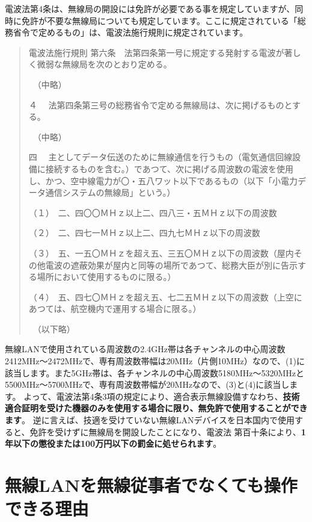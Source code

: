 電波法第4条は、無線局の開設には免許が必要である事を規定していますが、同時に免許が不要な無線局についても規定しています。ここに規定されている「総務省令で定めるもの」は、電波法施行規則に規定されています。
\begin{quotation}
    電波法施行規則 第六条　法第四条第一号に規定する発射する電波が著しく微弱な無線局を次のとおり定める。

    　（中略）

    ４ 　法第四条第三号の総務省令で定める無線局は、次に掲げるものとする。

    　（中略）

    四 　主としてデータ伝送のために無線通信を行うもの（電気通信回線設備に接続するものを含む。）であつて、次に掲げる周波数の電波を使用し、かつ、空中線電力が〇・五八ワット以下であるもの（以下「小電力データ通信システムの無線局」という。）

    （１）　二、四〇〇ＭＨｚ以上二、四八三・五ＭＨｚ以下の周波数

    （２）　二、四七一ＭＨｚ以上二、四九七ＭＨｚ以下の周波数

    （３）　五、一五〇ＭＨｚを超え五、三五〇ＭＨｚ以下の周波数（屋内その他電波の遮蔽効果が屋内と同等の場所であつて、総務大臣が別に告示する場所において使用するものに限る。）

    （４）　五、四七〇ＭＨｚを超え五、七二五ＭＨｚ以下の周波数（上空にあつては、航空機内で運用する場合に限る。）

    　（以下略）
\end{quotation}

無線LANで使用されている周波数の2.4GHz帯は各チャンネルの中心周波数2412MHz〜2472MHzで、専有周波数帯幅は20MHz（片側10MHz）なので、(1)に該当します。また5GHz帯は、各チャンネルの中心周波数5180MHz〜5320MHzと5500MHz〜5700MHzで、専有周波数帯幅が20MHzなので、(3)と(4)に該当します。 よって、電波法第4条3項の規定により、適合表示無線設備すなわち、\textbf{技術適合証明を受けた機器のみを使用する場合に限り、無免許で使用することができます}。 逆に言えば、技適を受けていない無線LANデバイスを日本国内で使用すると、免許を受けずに無線局を開設したことになり、電波法 第百十条により、\textbf{1年以下の懲役または100万円以下の罰金に処せられます}。

\section*{無線LANを無線従事者でなくても操作できる理由}

